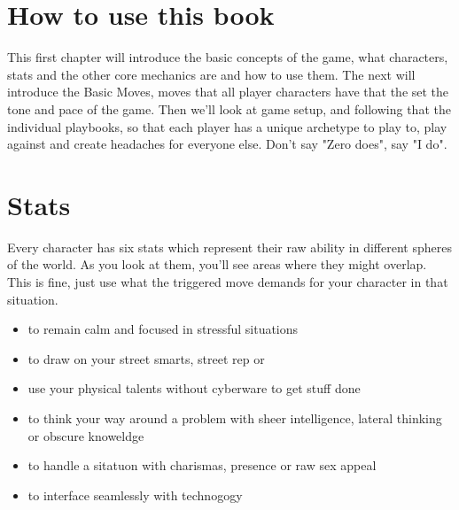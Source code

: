 \documentclass{tufte-book}
\begin{document}
\section{How to use this book} \label{sec: how to use this book}

This first chapter will introduce the basic concepts of the game, what characters, stats and the other core mechanics are and how to use them. The next will introduce the Basic Moves, moves that all player characters have that the set the tone and pace of the game. Then we'll look at game setup, and following that the individual playbooks, so that each player has a unique archetype to play to, play against and create headaches for everyone else. Don't say "Zero does", say "I do".

\section{Stats} \label{sec: Stats}
Every character has six stats which represent their raw ability in different spheres of the world. As you look at them, you'll see areas where they might overlap. This is fine, just use what the triggered move demands for your character in that situation.

\begin{itemize}
	\item {} to remain calm and focused in stressful situations
	\item {} to draw on your street smarts, street rep or 
	\item {} use your physical talents without cyberware to get stuff done
	\item {} to think your way around a problem with sheer intelligence, lateral thinking or obscure knoweldge
	\item {} to handle a sitatuon with charismas, presence or raw sex appeal
	\item {} to interface seamlessly with technogogy
\end{itemize}
\end{document}
